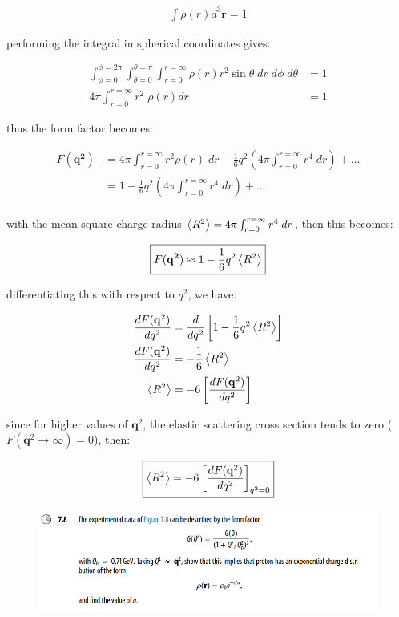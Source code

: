 \documentclass[11pt]{article}
\theoremstyle{definition}
\begin{document}
\begin{align}
    \int \rho(r) d^3\mathbf{r} = 1
\end{align}

performing the integral in spherical coordinates gives:

\begin{align}
    \int_{\phi=0}^{\phi=2\pi}\int_{\theta=0}^{\theta=\pi}\int_{r=0}^{r=\infty} \rho(r) r^2 \sin\theta\; dr\; d\phi\; d\theta  &= 1\\
    4\pi \int_{r=0}^{r=\infty}  r^2\; \rho(r) dr &= 1
\end{align}

thus the form factor becomes:

\begin{align}
    F (\mathbf{q^2})  &= 
    4\pi \int_{r=0}^{r=\infty} 
    r^2 \rho(r) \; dr  - \frac{1}{6}q^2 \left(4\pi \int_{r=0}^{r=\infty} r^4 \; dr \right)  + \dots\\
    &=
    1 - \frac{1}{6}q^2 \left(4\pi \int_{r=0}^{r=\infty} r^4 \; dr \right)  + \dots\\
\end{align}

with the mean square charge radius $\expval{R^2} = 4\pi \int_{r=0}^{r=\infty} r^4 \; dr $, then this becomes:

\begin{equation}
\boxed{
    F (\mathbf{q^2}) \approx 1-\frac{1}{6}q^2 \expval{R^2}
}
\end{equation}

differentiating this with respect to $q^2$, we have:

\begin{align}
    \frac{dF (\mathbf{q}^2)}{dq^2} &= \frac{d}{dq^2} \left[1-\frac{1}{6}q^2 \expval{R^2}\right]\\
    \frac{dF (\mathbf{q}^2)}{dq^2} &= -\frac{1}{6} \expval{R^2}\\
    \expval{R^2} &= -6 \left[\frac{dF (\mathbf{q}^2)}{dq^2}\right]
\end{align}

since for higher values of $\mathbf{q}^2$, the elastic scattering cross section tends to zero ($F(\mathbf{q}^2\to\infty)=0$), then:

\begin{equation}
\boxed{
    \expval{R^2} = -6 \left[\frac{dF (\mathbf{q}^2)}{dq^2}\right]_{q^2=0}
}
\end{equation}
\newpage
\begin{figure}[H]
    \centering
    \includegraphics[scale = 0.5]{7.8.png}
\end{figure}
\end{document}
